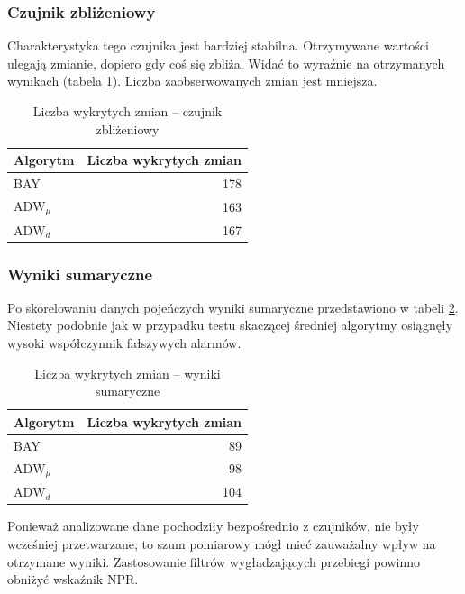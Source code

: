 \subsubsection*{Czujnik zbliżeniowy}
Charakterystyka tego czujnika jest bardziej stabilna.
Otrzymywane wartości ulegają zmianie, dopiero gdy coś się zbliża.
Widać to wyraźnie na otrzymanych wynikach (tabela \ref{tab:DistResutl}).
Liczba zaobserwowanych zmian jest mniejsza.
\begin{table}[h]
  \label{tab:DistResutl}
  \centering
  \begin{tabular}{l r }
    Algorytm & \multicolumn{1}{l}{Liczba wykrytych zmian} \\
    \hline
    BAY & 178 \\
    $\mbox{ADW}_{\mu}$ & 163 \\
    $\mbox{ADW}_{d}$ & 167\\
  \end{tabular}
  \caption{Liczba wykrytych zmian -- czujnik zbliżeniowy}
\end{table}

\subsubsection*{Wyniki sumaryczne}
Po skorelowaniu danych pojeńczych wyniki sumaryczne przedstawiono w tabeli \ref{tab:DevAllResutl}.
Niestety podobnie jak w przypadku testu skaczącej średniej algorytmy osiągnęły wysoki współczynnik fałszywych alarmów.
\begin{table}[h]
  \label{tab:DevAllResutl}
  \centering
  \begin{tabular}{l r}
    Algorytm & \multicolumn{1}{l}{Liczba wykrytych zmian} \\
    \hline
    BAY & 89 \\
    $\mbox{ADW}_{\mu}$ & 98 \\
    $\mbox{ADW}_{d}$ & 104 \\
  \end{tabular}
  \caption{Liczba wykrytych zmian -- wyniki sumaryczne}
\end{table}
Ponieważ analizowane dane pochodziły bezpośrednio z czujników,
nie były wcześniej przetwarzane,
to szum pomiarowy mógł mieć zauważalny wpływ na otrzymane wyniki.
Zastosowanie filtrów wygładzających przebiegi powinno obniżyć wskaźnik NPR.
